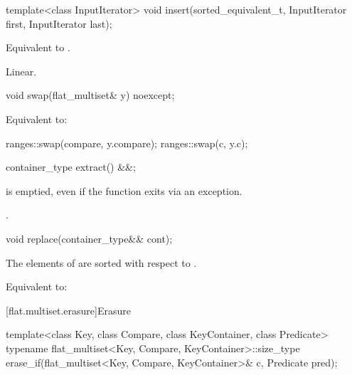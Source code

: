 %
\begin{itemdecl}
template<class InputIterator>
  void insert(sorted_equivalent_t, InputIterator first, InputIterator last);
\end{itemdecl}

\begin{itemdescr}
\pnum
\effects
Equivalent to .

\pnum
\complexity
Linear.
\end{itemdescr}

%
\begin{itemdecl}
void swap(flat_multiset& y) noexcept;
\end{itemdecl}

\begin{itemdescr}
\pnum
\effects
Equivalent to:
\begin{codeblock}
ranges::swap(compare, y.compare);
ranges::swap(c, y.c);
\end{codeblock}
\end{itemdescr}

%
\begin{itemdecl}
container_type extract() &&;
\end{itemdecl}

\begin{itemdescr}
\pnum
\ensures
{} is emptied, even if the function exits via an exception.

\pnum
\returns
{}.
\end{itemdescr}

%
\begin{itemdecl}
void replace(container_type&& cont);
\end{itemdecl}

\begin{itemdescr}
\pnum
\expects
The elements of  are sorted with respect to .

\pnum
\effects
Equivalent to: 
\end{itemdescr}

[flat.multiset.erasure]{Erasure}

%
\begin{itemdecl}
template<class Key, class Compare, class KeyContainer, class Predicate>
  typename flat_multiset<Key, Compare, KeyContainer>::size_type
    erase_if(flat_multiset<Key, Compare, KeyContainer>& c, Predicate pred);
\end{itemdecl}

